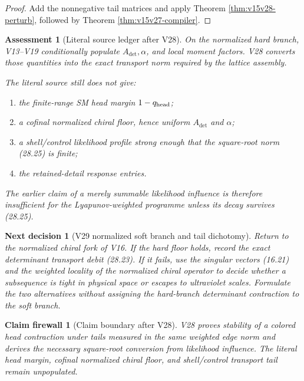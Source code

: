\documentclass[11pt]{article}
\newtheorem{firewall}[theorem]{Claim firewall}
\newtheorem{decision}[theorem]{Next decision}
\newtheorem{assessment}[theorem]{Assessment}
\theoremstyle{remark}
\begin{document}
\begin{proof}
Add the nonnegative tail matrices and apply Theorem
\ref{thm:v15v28-perturb}, followed by Theorem
\ref{thm:v15v27-compiler}.
\end{proof}

\begin{assessment}[Literal source ledger after V28]
\label{ass:v15v28-source}
On the normalized hard branch, V13--V19 conditionally populate
\(A_{\det},\alpha\), and local moment factors.  V28 converts those
quantities into the exact transport norm required by the lattice
assembly.

The literal source still does not give:
\begin{enumerate}
\item the finite-range SM head margin \(1-q_{\rm head}\);
\item a cofinal normalized chiral floor, hence uniform
      \(A_{\det}\) and \(\alpha\);
\item a shell/control likelihood profile strong enough that the
      square-root norm (28.25) is finite;
\item the retained-detail response entries.
\end{enumerate}
The earlier claim of a merely summable likelihood influence is
therefore insufficient for the Lyapunov-weighted programme unless
its decay survives (28.25).
\end{assessment}

\begin{decision}[V29 normalized soft branch and tail dichotomy]
\label{dec:v15v28-next}
Return to the normalized chiral fork of V16.  If the hard floor
holds, record the exact determinant transport debit (28.23).  If it
fails, use the singular vectors (16.21) and the weighted locality
of the normalized chiral operator to decide whether a subsequence
is tight in physical space or escapes to ultraviolet scales.
Formulate the two alternatives without assigning the hard-branch
determinant contraction to the soft branch.
\end{decision}

\begin{firewall}[Claim boundary after V28]
\label{fire:v15v28}
V28 proves stability of a colored head contraction under tails
measured in the same weighted edge norm and derives the necessary
square-root conversion from likelihood influence.  The literal
head margin, cofinal normalized chiral floor, and shell/control
transport tail remain unpopulated.
\end{firewall}
\end{document}
